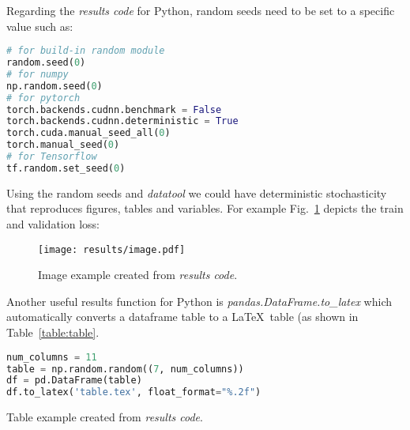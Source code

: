 \documentclass[journal]{IEEEtran}
\begin{document}
Regarding the \textit{results code} for Python, random seeds need to be set to a specific value such as:
\begin{lstlisting}[language=python, style=lststyle, caption={Python reproducibility commands for some popular libraries.}, captionpos=b]
# for build-in random module
random.seed(0)
# for numpy
np.random.seed(0)
# for pytorch
torch.backends.cudnn.benchmark = False
torch.backends.cudnn.deterministic = True
torch.cuda.manual_seed_all(0)
torch.manual_seed(0)
# for Tensorflow
tf.random.set_seed(0)
\end{lstlisting}

Using the random seeds and \textit{datatool} we could have deterministic stochasticity that reproduces figures, tables and variables.
For example Fig.~\ref{fig:image} depicts the train and validation loss:
\begin{figure}[h]
	\texttt{[image: results/image.pdf]}
	\caption{Image example created from \textit{results code}.}
	\label{fig:image}
\end{figure}

Another useful results function for Python is \textit{pandas.DataFrame.to\_latex} which automatically converts a dataframe table to a \LaTeX\ table (as shown in Table~\ref{table:table}.

\begin{lstlisting}[language=python, style=lststyle, caption={Convert Pandas DataFrame to \LaTeX\ table.}, captionpos=b]
num_columns = 11
table = np.random.random((7, num_columns))
df = pd.DataFrame(table)
df.to_latex('table.tex', float_format="%.2f")
\end{lstlisting}

\begin{table}[h]
	\centering
	\caption{Table example created from \textit{results code}.}
	\label{table:table}
	\setlength\tabcolsep{4.2pt}
	
\end{table}



\end{document}
